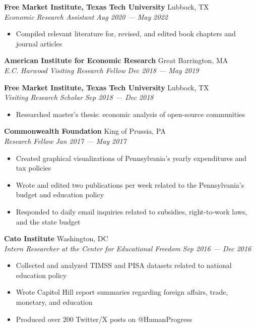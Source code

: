 \documentclass[a4paper,11pt]{article}
\begin{document}
\textbf{Free Market Institute, Texas Tech University} \hfill Lubbock, TX\\
\textit{Economic Research Assistant} \hfill  \emph{Aug 2020 --- May 2022} \\
\begin{itemize}
    \item Compiled relevant literature for, revised, and edited book chapters and journal articles
\end{itemize}
\vspace{1mm}

\textbf{American Institute for Economic Research} \hfill Great Barrington, MA\\
\textit{E.C. Harwood Visiting Research Fellow} \hfill  \emph{Dec 2018 --- May 2019}\\
\vspace{1mm}

\textbf{Free Market Institute, Texas Tech University} \hfill Lubbock, TX\\
\textit{Visiting Research Scholar} \hfill  \emph{Sep 2018 --- Dec 2018}\\
\begin{itemize}
    \item Researched master's thesis: economic analysis of open-source communities
\end{itemize}
\vspace{1mm}

\textbf{Commonwealth Foundation} \hfill King of Prussia, PA\\
\textit{Research Fellow} \hfill  \emph{Jan 2017 --- May 2017}\\
\begin{itemize}
    \item Created graphical visualizations of Pennsylvania's yearly expenditures and tax policies
    \item Wrote and edited two publications per week related to the Pennsylvania's budget and education policy
    \item Responded to daily email inquiries related to subsidies, right-to-work laws, and the state budget
\end{itemize}
\vspace{1mm}

\textbf{Cato Institute} \hfill Washington, DC\\
\textit{Intern Researcher at the Center for Educational Freedom} \hfill \emph{Sep 2016 --- Dec 2016}\\
\begin{itemize}
    \item Collected and analyzed TIMSS and PISA datasets related to national education policy
    \item Wrote Capitol Hill report summaries regarding foreign affairs, trade, monetary, and education
    \item Produced over 200 Twitter/X posts on @HumanProgress
\end{itemize}
\vspace{1mm}
\end{document}
